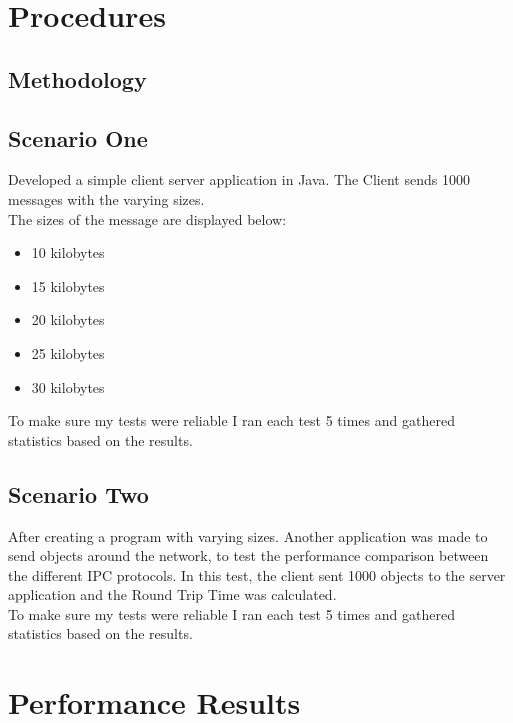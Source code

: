 \documentclass{article}
\begin{document}
\section{Procedures}

\subsection{Methodology}
\subsection{Scenario One}
Developed a simple client server application in Java. The Client sends 1000 messages with the varying sizes. \\

The sizes of the message are displayed below: 
\begin{itemize}
\item 10 kilobytes
\item 15 kilobytes
\item 20 kilobytes
\item 25 kilobytes
\item 30 kilobytes
\end{itemize}

To make sure my tests were reliable I ran each test 5 times and gathered statistics based on the results.


\subsection{Scenario Two}
After creating a program with varying sizes. Another application was made to send objects around the network, to test the performance 
comparison between the different IPC protocols. In this test, the client sent 1000 objects to the server application and the Round Trip Time was calculated. \\

	To make sure my tests were reliable I ran each test 5 times and gathered statistics based on the results.




\section{Performance Results}
\end{document}
